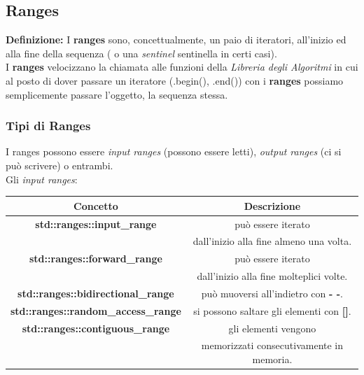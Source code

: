 \subsection{Ranges}

\label{ranges}


\textsf{\small \textbf{Definizione: } I \textbf{ranges} sono, concettualmente, un paio di iteratori, all'inizio ed alla fine della sequenza ( o una \emph{sentinel} sentinella in certi casi).} \\

\textsf{\small I \textbf{ranges} velocizzano la chiamata alle funzioni della \emph{Libreria degli Algoritmi} in cui al posto di dover passare un iteratore (.begin(), .end()) con i \textbf{ranges} possiamo semplicemente passare l'oggetto, la sequenza stessa.} \break

\subsubsection{Tipi di Ranges}

\textsf{\small I ranges possono essere \emph{input ranges} (possono essere letti), \emph{output ranges} (ci si può scrivere) o entrambi.} \\

\textsf{\small Gli \emph{input ranges}: } \\

\begin{tabular}{|c|c|}
	\hline
	\textbf{Concetto} & \textbf{Descrizione} \\
	\hline
	\textsf{\small \textbf{std::ranges::input\_range}} & \textsf{\small può essere iterato } \\
	\textsf{\small \textbf{}} & \textsf{\small dall'inizio alla fine almeno una volta.} \\
	\hline
	\textsf{\small \textbf{std::ranges::forward\_range}} & \textsf{\small può essere iterato } \\
	\textsf{\small \textbf{}} & \textsf{\small dall'inizio alla fine molteplici volte.} \\
	\hline
	\textsf{\small \textbf{std::ranges::bidirectional\_range}} & \textsf{\small può muoversi all'indietro con \textbf{- -}.} \\
	\hline
	\textsf{\small \textbf{std::ranges::random\_access\_range}} & \textsf{\small si possono saltare gli elementi con \textbf{[]}.} \\
	\hline
	\textsf{\small \textbf{std::ranges::contiguous\_range}} & \textsf{\small gli elementi vengono } \\
	\textsf{\small \textbf{}} & \textsf{\small memorizzati consecutivamente in memoria.} \\
	\hline
\end{tabular}

